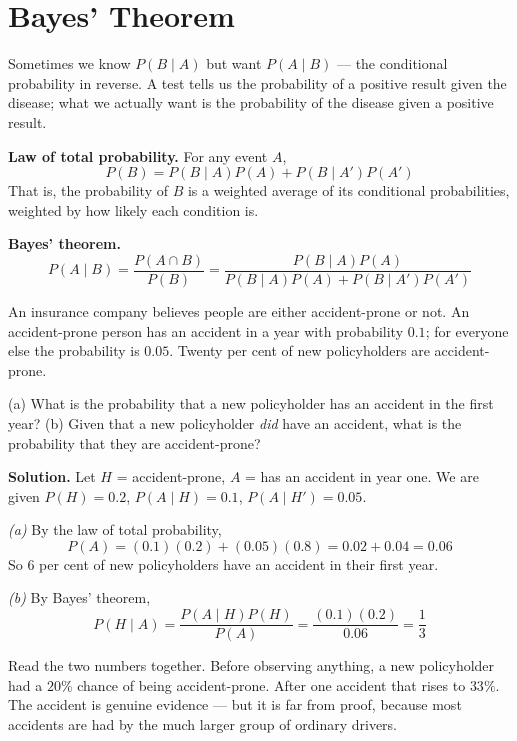 \documentclass[a4paper,11pt]{article}
\begin{document}
\section{Bayes' Theorem}

Sometimes we know $P(B \mid A)$ but want $P(A \mid B)$ --- the conditional
probability in reverse. A test tells us the probability of a positive result
given the disease; what we actually want is the probability of the disease given
a positive result.

\begin{keybox}
\textbf{Law of total probability.} For any event $A$,
\[ P(B) = P(B \mid A)P(A) + P(B \mid A')P(A') \]
That is, the probability of $B$ is a weighted average of its conditional
probabilities, weighted by how likely each condition is.

\textbf{Bayes' theorem.}
\[ P(A \mid B) = \frac{P(A \cap B)}{P(B)}
              = \frac{P(B \mid A)P(A)}{P(B \mid A)P(A) + P(B \mid A')P(A')} \]
\end{keybox}

\begin{example}
An insurance company believes people are either accident-prone or not. An
accident-prone person has an accident in a year with probability $0.1$; for
everyone else the probability is $0.05$. Twenty per cent of new policyholders
are accident-prone.

(a) What is the probability that a new policyholder has an accident in the first
year? (b) Given that a new policyholder \emph{did} have an accident, what is the
probability that they are accident-prone?

\medskip
\textbf{Solution.} Let $H$ = accident-prone, $A$ = has an accident in year one.
We are given $P(H) = 0.2$, $P(A \mid H) = 0.1$, $P(A \mid H') = 0.05$.

\emph{(a)} By the law of total probability,
\[ P(A) = (0.1)(0.2) + (0.05)(0.8) = 0.02 + 0.04 = 0.06 \]
So 6 per cent of new policyholders have an accident in their first year.

\emph{(b)} By Bayes' theorem,
\[ P(H \mid A) = \frac{P(A \mid H)P(H)}{P(A)}
               = \frac{(0.1)(0.2)}{0.06} = \frac{1}{3} \]

Read the two numbers together. Before observing anything, a new policyholder had
a $20\%$ chance of being accident-prone. After one accident that rises to
$33\%$. The accident is genuine evidence --- but it is far from proof, because
most accidents are had by the much larger group of ordinary drivers.
\end{example}
\end{document}
